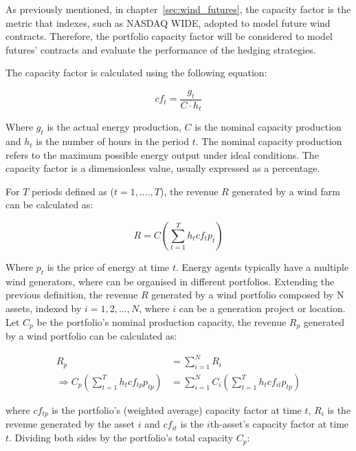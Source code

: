     As previously mentioned, in chapter~\ref{sec:wind_futures},
    the capacity factor is the metric that indexes, such as NASDAQ WIDE, adopted to model future wind contracts.
    Therefore, the portfolio capacity factor will be considered to model futures' contracts and evaluate the
    performance of the hedging strategies.

    The capacity factor is calculated using the following equation:

    \begin{equation}
        cf_t =
        \frac{g_{t}}{C \cdot h_{t}}
    \label{eq:capacity_factor}
    \end{equation}

    Where $g_{t}$ is the actual energy production, $C$ is the nominal capacity production and $h_{t}$ is the
    number of hours in the period $t$.
    The nominal capacity production refers to the maximum possible energy output under ideal conditions.
    The capacity factor is a dimensionless value, usually expressed as a percentage.

    For $T$ periods defined as ($t=1,....,T$), the revenue $R$ generated by a wind farm can be calculated as:

    \begin{equation}
        R = C \left( \sum_{t=1}^{T} h_{t} cf_{t} p_{t} \right)
    \label{eq:revenue_wf}
    \end{equation}

    Where $p_{t}$ is the price of energy at time $t$.
    Energy agents typically have a multiple wind generators, where can be organised in different portfolios.
    Extending the previous definition, the revenue $R$ generated by a wind portfolio composed by N assets, indexed by
    $i= 1,2, ..., N$, where $i$ can be a generation project or location.
    Let $C_{p}$ be the portfolio's nominal production capacity,
    the revenue $R_{p}$ generated by a wind portfolio can be calculated as:

    \begin{align}
        R_{p} &= \sum_{i=1}^{N} R_{i} \\
        \Rightarrow C_{p} \left( \sum_{t=1}^{T} h_{t} cf_{tp} p_{tp} \right) &=
        \sum_{i=1}^{N} C_{i} \left(  \sum_{t=1}^{T} h_{t} cf_{it} p_{tp} \right)
    \label{eq:revenue_pf}
    \end{align}

    where $cf_{tp}$ is the portfolio's (weighted average) capacity factor at time $t$, $R_{i}$ is the revenue generated by
    the asset $i$ and $cf_{it}$ is the $i$th-asset's capacity factor at time $t$.
    Dividing both sides by the portfolio's total capacity $C_{p}$:

